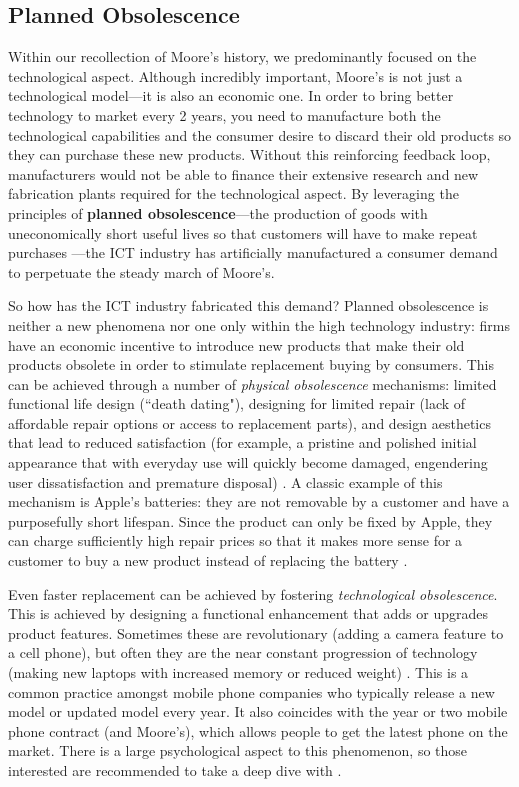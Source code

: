 \documentclass{article}
\begin{document}
\subsection{Planned Obsolescence} \label{SECTION_PLANNED_OBSOLESCCENCE}

Within our recollection of Moore's history, we predominantly focused on the technological aspect. Although incredibly important, Moore's is not just a technological model---it is also an economic one. In order to bring better technology to market every 2 years, you need to manufacture both the technological capabilities and the consumer desire to discard their old products so they can purchase these new products. Without this reinforcing feedback loop, manufacturers would not be able to finance their extensive research and new fabrication plants required for the technological aspect. By leveraging the principles of \textbf{planned obsolescence}---the production of goods with uneconomically short useful lives so that customers will have to make repeat purchases
\cite{bulow1986economic}---the ICT industry has artificially manufactured a consumer demand to perpetuate the steady march of Moore's.

So how has the ICT industry fabricated this demand? Planned obsolescence is neither a new phenomena nor one only within the high technology industry: firms have an economic incentive to introduce new products that make their old products obsolete in order to stimulate replacement buying by consumers. This can be achieved through a number of \textit{physical obsolescence} mechanisms: limited functional life design (``death dating"), designing for limited repair (lack of affordable repair options or access to replacement parts), and design aesthetics that lead to reduced satisfaction (for example, a pristine and polished initial appearance that with everyday use will quickly become damaged, engendering user dissatisfaction and premature disposal) \cite{guiltinan2009creative}. A classic example of this mechanism is Apple's batteries: they are not removable by a customer and have a purposefully short lifespan. Since the product can only be fixed by Apple, they can charge sufficiently high repair prices so that it makes more sense for a customer to buy a new product instead of replacing the battery \cite{keeble2013culture}.

Even faster replacement can be achieved by fostering \textit{technological obsolescence}. This is achieved by designing a functional enhancement that adds or upgrades product features. Sometimes these are revolutionary (adding a camera feature to a cell phone), but often they are the near constant progression of technology (making new laptops with increased memory or reduced weight) \cite{guiltinan2009creative}. This is a common practice amongst mobile phone companies who typically release a new model or updated model every year. It also coincides with the year or two mobile phone contract (and Moore's), which allows people to get the latest phone on the market. There is a large psychological aspect to this phenomenon, so those interested are recommended to take a deep dive with \cite{keeble2013culture}. 
\end{document}
